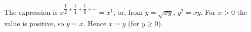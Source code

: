 The expression is $x^{\dfrac12+\dfrac14+\dfrac18+\cdots}=x^1$, or, from $y=\sqrt{xy}$, $y^2=xy$. For $x>0$ the value is positive, so $y=x$. Hence $\boxed{x=y}$ (for $y\ge0$).
